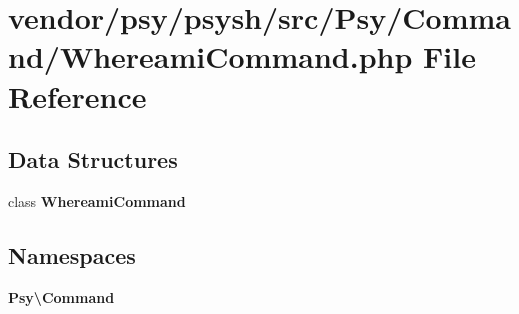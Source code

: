 \section{vendor/psy/psysh/src/\+Psy/\+Command/\+Whereami\+Command.php File Reference}
\label{_whereami_command_8php}
\subsection*{Data Structures}
\begin{DoxyCompactItemize}
\item 
class {\bf Whereami\+Command}
\end{DoxyCompactItemize}
\subsection*{Namespaces}
\begin{DoxyCompactItemize}
\item 
 {\bf Psy\textbackslash{}\+Command}
\end{DoxyCompactItemize}
